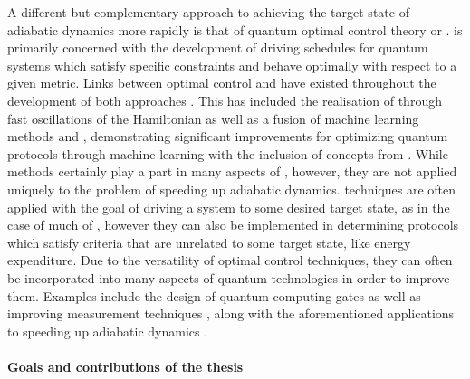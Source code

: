 A different but complementary approach to achieving the target state of adiabatic dynamics more rapidly is that of quantum optimal control theory or  \cite{glaser_training_2015, koch_quantum_2022}.  is primarily concerned with the development of driving schedules for quantum systems which satisfy specific constraints and behave optimally with respect to a given metric. Links between optimal control and  have existed throughout the development of both approaches \cite{stefanatos_frictionless_2010, stefanatos_shortcut_2021, zhang_connection_2021}. This has included the realisation of  through fast oscillations of the Hamiltonian \cite{petiziol_accelerated_2020, petiziol_fast_2018} as well as a fusion of machine learning methods and , demonstrating significant improvements for optimizing quantum protocols through machine learning with the inclusion of concepts from  \cite{bukov_reinforcement_2018, yao_reinforcement_2021, khait_optimal_2022}. While  methods certainly play a part in many aspects of , however, they are not applied uniquely to the problem of speeding up adiabatic dynamics.  techniques are often applied with the goal of driving a system to some desired target state, as in the case of much of , however they can also be implemented in determining protocols which satisfy criteria that are unrelated to some target state, like energy expenditure. Due to the versatility of optimal control techniques, they can often be incorporated into many aspects of quantum technologies in order to improve them. Examples include the design of quantum computing gates \cite{pelegri_high-fidelity_2022} as well as improving measurement techniques \cite{wiseman_quantum_2009}, along with the aforementioned applications to speeding up adiabatic dynamics \cite{guery-odelin_shortcuts_2019}.


\paragraph*{Goals and contributions of the thesis}

